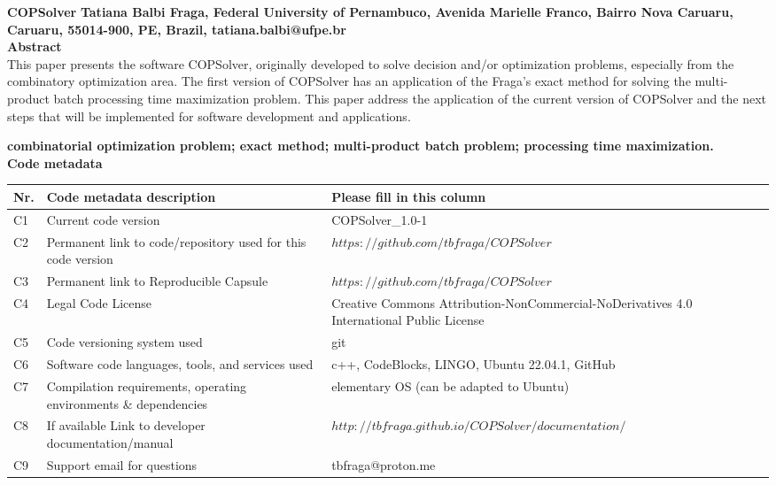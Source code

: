\documentclass[11pt, letterpaper]{article}
\begin{document}
\noindent
\textbf{COPSolver}
\vskip0.5cm
\noindent
\textbf{Tatiana Balbi Fraga, Federal University of Pernambuco, Avenida Marielle
Franco, Bairro Nova Caruaru, Caruaru, 55014-900, PE, Brazil, tatiana.balbi@ufpe.br}\\

\noindent
\textbf{Abstract}\\
This paper presents the software COPSolver, originally developed to solve decision and/or optimization problems, especially from the combinatory optimization area. The first version of COPSolver has an application of the Fraga's exact method for solving the multi-product batch processing time maximization problem. This paper address the application of the current version of COPSolver and the next steps that will be implemented for software development and applications.
\vskip0.5cm

\noindent
\textbf{combinatorial optimization problem; exact method; multi-product batch problem; processing time maximization.}\\
\vskip0.5cm
\newpage
\noindent
\textbf{Code metadata}\\

\noindent
\begin{tabular}{|l|p{6.5cm}|p{9.5cm}|}
\hline
\textbf{Nr.} & \textbf{Code metadata description} & \textbf{Please fill in this column} \\
\hline
C1 & Current code version & COPSolver\_1.0-1 \\
\hline
C2 & Permanent link to code/repository used for this code version & \underline{$https://github.com/tbfraga/COPSolver$} \\
\hline
C3  & Permanent link to Reproducible Capsule & \underline{$https://github.com/tbfraga/COPSolver$}\\
\hline
C4 & Legal Code License   & Creative Commons Attribution-NonCommercial-NoDerivatives 4.0 International Public License \\
\hline
C5 & Code versioning system used & git \\
\hline
C6 & Software code languages, tools, and services used & c++, CodeBlocks, LINGO, Ubuntu 22.04.1, GitHub\\
\hline
C7 & Compilation requirements, operating environments \& dependencies & elementary OS (can be adapted to Ubuntu) \\
\hline
C8 & If available Link to developer documentation/manual & \underline{$http://tbfraga.github.io/COPSolver/documentation/$} \\
\hline
C9 & Support email for questions & tbfraga@proton.me\\
\hline
\end{tabular}\\
\vskip0.5cm
\noindent
\end{document}
